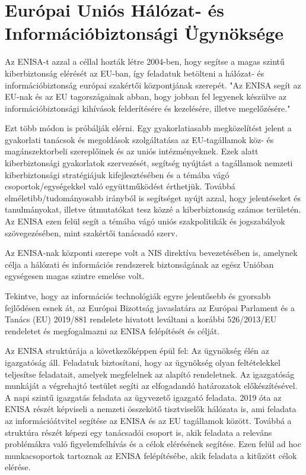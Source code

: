 \section{Európai Uniós Hálózat- és Információbiztonsági Ügynöksége}

Az ENISA-t azzal a céllal hozták létre 2004-ben, hogy segítse a magas szintű kiberbiztonság elérését az EU-ban, így feladatuk betölteni a hálózat- és információbiztonság európai szakértői központjának szerepét. "Az ENISA segít az EU-nak és az EU tagországainak abban, hogy jobban fel legyenek készülve az információbiztonsági kihívások felderítésére és kezelésére, illetve megelőzésére." \cite{ENISA-osszefoglalo}

Ezt több módon is próbálják elérni. Egy gyakorlatiasabb megközelítést jelent a gyakorlati tanácsok és megoldások szolgáltatása az EU-tagállamok köz- és magánszektorbeli szereplőinek és az uniós intézményeknek. Ezek alatt kiberbiztonsági gyakorlatok szervezését, segítség nyújtást a tagállamok nemzeti kiberbiztonsági stratégiájuk kifejlesztésében és a témába vágó csoportok/egységekkel való együttműködést érthetjük. Továbbá elméletibb/tudományosabb irányból is segítséget nyújt azzal, hogy jelentéseket és tanulmányokat, illetve útmutatókat tesz közzé a kiberbiztonság számos területén. Az ENISA ezen felül segít a témába vágó uniós szakpolitikák és jogszabályok szövegezésében, mint szakértői tanácsadó szerv.

Az ENISA-nak központi szerepe volt a NIS direktíva bevezetésében is, amelynek célja a hálózati és információs rendszerek biztonságának az egész Unióban egységesen magas szintre emelése volt. \cite{NIS-direktiva}

Tekintve, hogy az információs technológiák egyre jelentősebb és gyorsabb fejlődésen esnek át, az Európai Bizottság javaslatára az Európai Parlament és a Tanács (EU) 2019/881 rendelete \cite{2019/881} hivatott leváltani a korábbi 526/2013/EU rendeletet és megfogalmazni az ENISA felépítését és célját.

Az ENISA struktúrája a következőképpen épül fel: Az ügynökség élén az igazgatóság áll. Feladatuk biztosítani, hogy az ügynökség olyan feltételekkel teljesítse feladatait, amelyek megfelelnek az alapító rendeletnek. Az igazgatóság munkáját a végrehajtó testület segíti az elfogadandó határozatok előkészítésével. A napi szintű igazgatás feladata az ügyvezető igazgató feladata. 2019 óta az ENISA részét képviseli a nemzeti összekötő tisztviselők hálózata is, ami feladata az információátvitel segítése az ENISA és az EU tagállamok között. Továbbá a struktúra részét képezi egy tanácsadói csoport is, akik feladata a releváns problémákra való figyelemfelhívás és a célok elérésének segítése. Ezen felül ad hoc munkacsoportok tartoznak az ENISA felépítésébe, akik feladata a kitűzött célok elérése.

